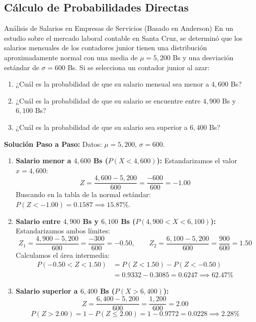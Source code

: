 \subsection{Cálculo de Probabilidades Directas}
\begin{ejemplo}{Análisis de Salarios en Empresas de Servicios (Basado en Anderson)}
En un estudio sobre el mercado laboral contable en Santa Cruz, se determinó que los salarios mensuales de los contadores junior tienen una distribución aproximadamente normal con una media de $\mu = 5{,}200$ Bs y una desviación estándar de $\sigma = 600$ Bs. Si se selecciona un contador junior al azar:
\begin{enumerate}[label=\alph*)]
    \item ¿Cuál es la probabilidad de que su salario mensual sea menor a $4{,}600$ Bs?
    \item ¿Cuál es la probabilidad de que su salario se encuentre entre $4{,}900$ Bs y $6{,}100$ Bs?
    \item ¿Cuál es la probabilidad de que su salario sea superior a $6{,}400$ Bs?
\end{enumerate}

\tcbline
\textbf{Solución Paso a Paso:}
Datos: $\mu = 5{,}200$, $\sigma = 600$.
\begin{enumerate}[label=\alph*)]
    \item \textbf{Salario menor a $4{,}600$ Bs ($P(X < 4{,}600)$):}
    Estandarizamos el valor $x = 4{,}600$:
    \[
    Z = \frac{4{,}600 - 5{,}200}{600} = \frac{-600}{600} = -1.00
    \]
    Buscando en la tabla de la normal estándar: $P(Z < -1.00) = 0.1587 \implies 15.87\%$.
    
    \item \textbf{Salario entre $4{,}900$ Bs y $6{,}100$ Bs ($P(4{,}900 < X < 6{,}100)$):}
    Estandarizamos ambos límites:
    \[
    Z_1 = \frac{4{,}900 - 5{,}200}{600} = \frac{-300}{600} = -0.50, \qquad Z_2 = \frac{6{,}100 - 5{,}200}{600} = \frac{900}{600} = 1.50
    \]
    Calculamos el área intermedia:
    \begin{align*}
        P(-0.50 < Z < 1.50) &= P(Z < 1.50) - P(Z < -0.50) \\
        &= 0.9332 - 0.3085 = 0.6247 \implies 62.47\%
    \end{align*}
    
    \item \textbf{Salario superior a $6{,}400$ Bs ($P(X > 6{,}400)$):}
    \[
    Z = \frac{6{,}400 - 5{,}200}{600} = \frac{1{,}200}{600} = 2.00
    \]
    \[
    P(Z > 2.00) = 1 - P(Z \le 2.00) = 1 - 0.9772 = 0.0228 \implies 2.28\%
    \]
\end{enumerate}
\end{ejemplo}

